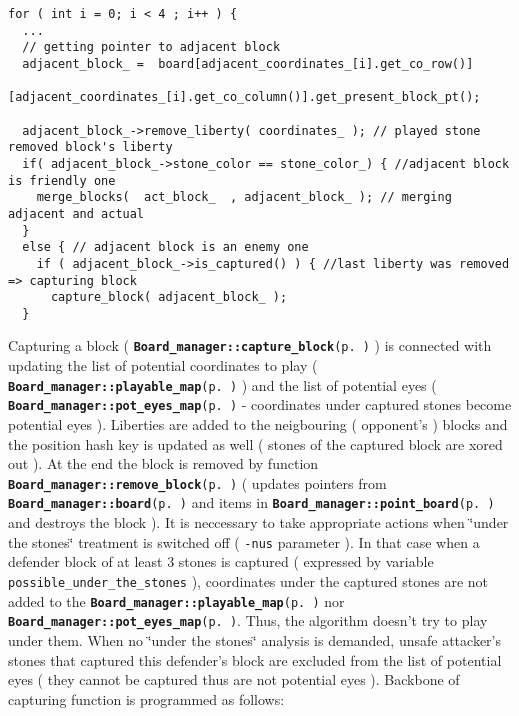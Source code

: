 \footnotesize\begin{verbatim}for ( int i = 0; i < 4 ; i++ ) {
  ...
  // getting pointer to adjacent block 
  adjacent_block_ =  board[adjacent_coordinates_[i].get_co_row()]
                      [adjacent_coordinates_[i].get_co_column()].get_present_block_pt(); 

  adjacent_block_->remove_liberty( coordinates_ ); // played stone removed block's liberty
  if( adjacent_block_->stone_color == stone_color_) { //adjacent block is friendly one
    merge_blocks(  act_block_  , adjacent_block_ ); // merging adjacent and actual 
  }
  else { // adjacent block is an enemy one 
    if ( adjacent_block_->is_captured() ) { //last liberty was removed => capturing block
      capture_block( adjacent_block_ );
  }
\end{verbatim}
\normalsize


Capturing a block ( {\tt {\bf Board\_\-manager::capture\_\-block}{\rm (p.\,\pageref{classBoard__manager_a2})}} ) is connected with updating the list of potential coordinates to play ( {\tt {\bf Board\_\-manager::playable\_\-map}{\rm (p.\,\pageref{classBoard__manager_r2})}} ) and the list of potential eyes ( {\tt {\bf Board\_\-manager::pot\_\-eyes\_\-map}{\rm (p.\,\pageref{classBoard__manager_o0})}} - coordinates under captured stones become potential eyes ). Liberties are added to the neigbouring ( opponent's ) blocks and the position hash key is updated as well ( stones of the captured block are xored out ). At the end the block is removed by function {\tt {\bf Board\_\-manager::remove\_\-block}{\rm (p.\,\pageref{classBoard__manager_a3})}} ( updates pointers from {\tt {\bf Board\_\-manager::board}{\rm (p.\,\pageref{classBoard__manager_r1})}} and items in {\tt {\bf Board\_\-manager::point\_\-board}{\rm (p.\,\pageref{classBoard__manager_o5})}} and destroys the block ). It is neccessary to take appropriate actions when \char`\"{}under the stones\char`\"{} treatment is switched off ( {\tt -nus} parameter ). In that case when a defender block of at least 3 stones is captured ( expressed by variable {\tt possible\_\-under\_\-the\_\-stones} ), coordinates under the captured stones are not added to the {\tt {\bf Board\_\-manager::playable\_\-map}{\rm (p.\,\pageref{classBoard__manager_r2})}} nor {\tt {\bf Board\_\-manager::pot\_\-eyes\_\-map}{\rm (p.\,\pageref{classBoard__manager_o0})}}. Thus, the algorithm doesn't try to play under them. When no \char`\"{}under the stones\char`\"{} analysis is demanded, unsafe attacker's stones that captured this defender's block are excluded from the list of potential eyes ( they cannot be captured thus are not potential eyes ). Backbone of capturing function is programmed as follows:



